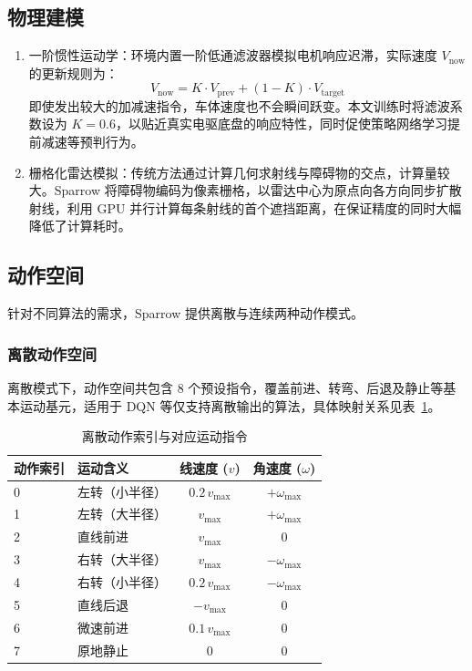 \documentclass[
  oneside,
  degree=bachelor,
  fullwidthstop=false,
  fontset=fandol,
  times=false,
  minted=true,
  biblatex=true,
]{tongjithesis}
\begin{document}
\subsection{物理建模}

\begin{enumerate}
    \item 一阶惯性运动学：环境内置一阶低通滤波器模拟电机响应迟滞，实际速度 $V_{\text{now}}$ 的更新规则为：
    \begin{equation}
        V_{\text{now}} = K \cdot V_{\text{prev}} + (1-K) \cdot V_{\text{target}}
    \end{equation}
    即使发出较大的加减速指令，车体速度也不会瞬间跃变。本文训练时将滤波系数设为 $K=0.6$，以贴近真实电驱底盘的响应特性，同时促使策略网络学习提前减速等预判行为。
    \item 栅格化雷达模拟：传统方法通过计算几何求射线与障碍物的交点，计算量较大。Sparrow 将障碍物编码为像素栅格，以雷达中心为原点向各方向同步扩散射线，利用 GPU 并行计算每条射线的首个遮挡距离，在保证精度的同时大幅降低了计算耗时。
\end{enumerate}

\subsection{动作空间}

针对不同算法的需求，Sparrow 提供离散与连续两种动作模式。

\subsubsection{离散动作空间}

离散模式下，动作空间共包含 8 个预设指令，覆盖前进、转弯、后退及静止等基本运动基元，适用于 DQN 等仅支持离散输出的算法，具体映射关系见表~\ref{tab:discrete_action}。

\begin{table}[H]
    \centering
    \caption{离散动作索引与对应运动指令}
    \label{tab:discrete_action}
    \begin{tabular}{llcc}
        \toprule
        \textbf{动作索引} & \textbf{运动含义} & \textbf{线速度 ($v$)} & \textbf{角速度 ($\omega$)} \\
        \midrule
        0 & 左转（小半径） & $0.2\,v_{\max}$ & $+\omega_{\max}$ \\
        1 & 左转（大半径） & $v_{\max}$ & $+\omega_{\max}$ \\
        2 & 直线前进 & $v_{\max}$ & $0$ \\
        3 & 右转（大半径） & $v_{\max}$ & $-\omega_{\max}$ \\
        4 & 右转（小半径） & $0.2\,v_{\max}$ & $-\omega_{\max}$ \\
        5 & 直线后退 & $-v_{\max}$ & $0$ \\
        6 & 微速前进 & $0.1\,v_{\max}$ & $0$ \\
        7 & 原地静止 & $0$ & $0$ \\
        \bottomrule
    \end{tabular}
\end{table}
\end{document}
